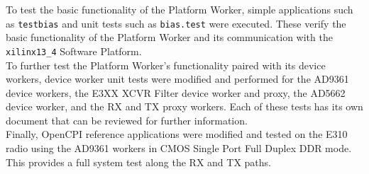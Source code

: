 \documentclass{article}
\newcommand{\code}[1]{\texttt{#1}} %
\begin{document}
\noindent To test the basic functionality of the Platform Worker, simple applications such as \code{testbias} and unit tests such as \code{bias.test} were executed. These verify the basic functionality of the Platform Worker and its communication with the \code{xilinx13\_4} Software Platform. \\

\noindent To further test the Platform Worker's functionality paired with its device workers, device worker unit tests were modified and performed for the AD9361 device workers, the E3XX XCVR Filter device worker and proxy, the AD5662 device worker, and the RX and TX proxy workers. Each of these tests has its own document that can be reviewed for further information. \\

\noindent Finally, OpenCPI reference applications were modified and tested on the E310 radio using the AD9361 workers in CMOS Single Port Full Duplex DDR mode. This provides a full system test along the RX and TX paths.
\end{document}
